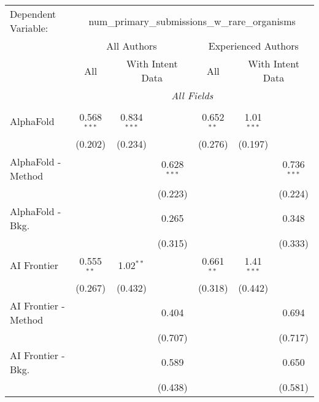 \begingroup
\centering
\begin{tabular}{lcccccc}
   \tabularnewline \midrule \midrule
   Dependent Variable: & \multicolumn{6}{c}{num\_primary\_submissions\_w\_rare\_organisms}\\
 & \multicolumn{3}{c}{All Authors} & \multicolumn{3}{c}{Experienced Authors} \\
\cmidrule(lr){2-4} \cmidrule(lr){5-7}
 & \multicolumn{1}{c}{All} & \multicolumn{2}{c}{With Intent Data} & \multicolumn{1}{c}{All} & \multicolumn{2}{c}{With Intent Data} \\
\cmidrule(lr){2-2} \cmidrule(lr){3-4} \cmidrule(lr){5-5} \cmidrule(lr){6-7}
 & \multicolumn{6}{c}{\textit{All Fields}} \\ \\
   AlphaFold            & 0.568$^{***}$ & 0.834$^{***}$ &               & 0.652$^{**}$ & 1.01$^{***}$ &   \\   
                        & (0.202)       & (0.234)       &               & (0.276)      & (0.197)      &   \\   
   AlphaFold - Method   &               &               & 0.628$^{***}$ &              &              & 0.736$^{***}$\\   
                        &               &               & (0.223)       &              &              & (0.224)\\   
   AlphaFold - Bkg.     &               &               & 0.265         &              &              & 0.348\\   
                        &               &               & (0.315)       &              &              & (0.333)\\   
   AI Frontier          & 0.555$^{**}$  & 1.02$^{**}$   &               & 0.661$^{**}$ & 1.41$^{***}$ &   \\   
                        & (0.267)       & (0.432)       &               & (0.318)      & (0.442)      &   \\   
   AI Frontier - Method &               &               & 0.404         &              &              & 0.694\\   
                        &               &               & (0.707)       &              &              & (0.717)\\   
   AI Frontier - Bkg.   &               &               & 0.589         &              &              & 0.650\\   
                        &               &               & (0.438)       &              &              & (0.581)\\   

\end{tabular}
